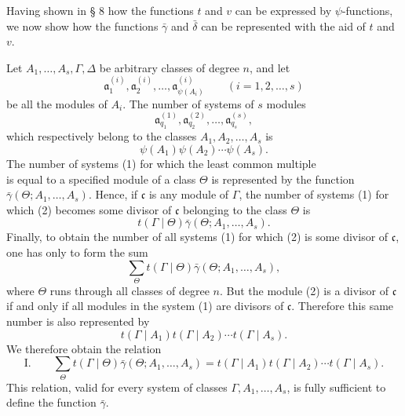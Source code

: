 Having shown in § 8 how the functions $t$ and $v$ can be expressed by $\psi$-functions, we now show how the functions $\bar\gamma$ and $\bar\delta$ can be represented with the aid of $t$ and $v$.



Let $A_1,\ldots,A_s,\Gamma,\Delta$ be arbitrary classes of degree $n$, and let
\[
 \mathfrak a^{(i)}_1,\mathfrak a^{(i)}_2,\ldots,
 \mathfrak a^{(i)}_{\psi(A_i)}\qquad (i=1,2,\ldots,s)
\]
be all the modules of $A_i$. The number of systems of $s$ modules
\begin{equation}
 \mathfrak a^{(1)}_{q_1},\mathfrak a^{(2)}_{q_2},\ldots,
 \mathfrak a^{(s)}_{q_s},
\tag{1}
\end{equation}
which respectively belong to the classes $A_1,A_2,\ldots,A_s$ is
\[
 \psi(A_1)\psi(A_2)\cdots\psi(A_s).
\]
The number of systems (1) for which the least common multiple
\begin{equation}
 [\mathfrak a^{(1)}_{q_1},\mathfrak a^{(2)}_{q_2},\ldots,
 \mathfrak a^{(s)}_{q_s}]
\tag{2}
\end{equation}
is equal to a specified module of a class $\Theta$ is represented by the function $\bar\gamma(\Theta;A_1,\ldots,A_s)$. Hence, if $\mathfrak c$ is any module of $\Gamma$, the number of systems (1) for which (2) becomes some divisor of $\mathfrak c$ belonging to the class $\Theta$ is
\[
 t(\Gamma\mid\Theta)\bar\gamma(\Theta;A_1,\ldots,A_s).
\]
Finally, to obtain the number of all systems (1) for which (2) is some divisor of $\mathfrak c$, one has only to form the sum
\[
 \sum_{\Theta}t(\Gamma\mid\Theta)\bar\gamma(\Theta;A_1,\ldots,A_s),
\]
where $\Theta$ runs through all classes of degree $n$. But the module (2) is a divisor of $\mathfrak c$ if and only if all modules in the system (1) are divisors of $\mathfrak c$. Therefore this same number is also represented by
\[
 t(\Gamma\mid A_1)t(\Gamma\mid A_2)\cdots t(\Gamma\mid A_s).
\]
We therefore obtain the relation
\[
\text{I.}\qquad
 \sum_{\Theta}t(\Gamma\mid\Theta)\bar\gamma(\Theta;A_1,\ldots,A_s)
 =t(\Gamma\mid A_1)t(\Gamma\mid A_2)\cdots t(\Gamma\mid A_s).
\]
This relation, valid for every system of classes $\Gamma,A_1,\ldots,A_s$, is fully sufficient to define the function $\bar\gamma$.

